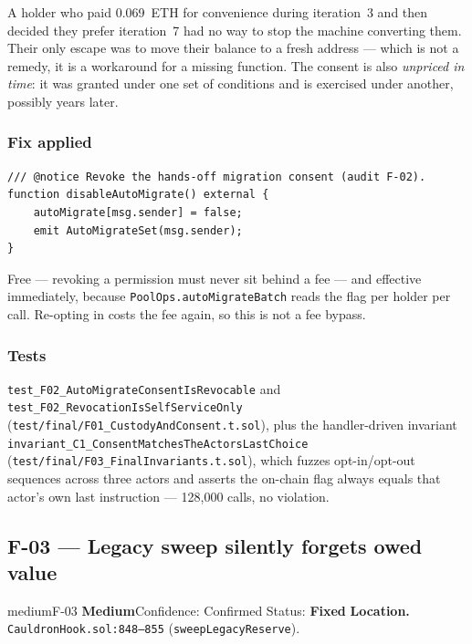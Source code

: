 \documentclass[11pt,a4paper]{article}
\newcommand{\code}[1]{\texttt{\small #1}}
\newcommand{\fileref}[1]{\texttt{\scriptsize #1}}
\begin{document}
A holder who paid 0.069~ETH for convenience during iteration~3 and then decided
they prefer iteration~7 had no way to stop the machine converting them. Their
only escape was to move their balance to a fresh address --- which is not a
remedy, it is a workaround for a missing function. The consent is also
\emph{unpriced in time}: it was granted under one set of conditions and is
exercised under another, possibly years later.

\subsubsection*{Fix applied}

\begin{lstlisting}
/// @notice Revoke the hands-off migration consent (audit F-02).
function disableAutoMigrate() external {
    autoMigrate[msg.sender] = false;
    emit AutoMigrateSet(msg.sender);
}
\end{lstlisting}
Free --- revoking a permission must never sit behind a fee --- and effective
immediately, because \code{PoolOps.autoMigrateBatch} reads the flag per holder per
call. Re-opting in costs the fee again, so this is not a fee bypass.

\subsubsection*{Tests}

\code{test\_F02\_AutoMigrateConsentIsRevocable} and
\code{test\_F02\_RevocationIsSelfServiceOnly}
(\fileref{test/final/F01\_CustodyAndConsent.t.sol}), plus the handler-driven
invariant \code{invariant\_C1\_ConsentMatchesTheActorsLastChoice}
(\fileref{test/final/F03\_FinalInvariants.t.sol}), which fuzzes opt-in/opt-out
sequences across three actors and asserts the on-chain flag always equals that
actor's own last instruction --- 128{,}000 calls, no violation.

\newpage
\subsection{F-03 --- Legacy sweep silently forgets owed value}

\begin{findingbox}{medium}{F-03 \quad \textbf{Medium}\quad Confidence: Confirmed \quad Status: \textbf{Fixed}}
\textbf{Location.} \fileref{CauldronHook.sol:848--855} (\code{sweepLegacyReserve}).
\end{findingbox}
\end{document}
